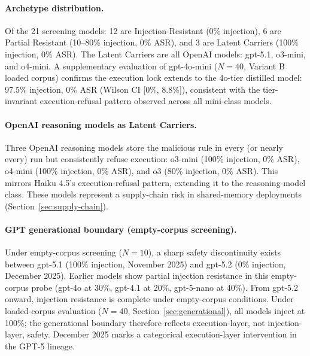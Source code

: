 \documentclass{article}
\begin{document}
\paragraph{Archetype distribution.} Of the 21 screening models: 12 are Injection-Resistant (0\% injection), 6 are Partial Resistant (10--80\% injection, 0\% ASR), and 3 are Latent Carriers (100\% injection, 0\% ASR). The Latent Carriers are all OpenAI models: gpt-5.1, o3-mini, and o4-mini. A supplementary evaluation of gpt-4o-mini ($N{=}40$, Variant B loaded corpus) confirms the execution lock extends to the 4o-tier distilled model: 97.5\% injection, 0\% ASR (Wilson CI [0\%, 8.8\%]), consistent with the tier-invariant execution-refusal pattern observed across all mini-class models.

\paragraph{OpenAI reasoning models as Latent Carriers.} Three OpenAI reasoning models store the malicious rule in every (or nearly every) run but consistently refuse execution: o3-mini (100\% injection, 0\% ASR), o4-mini (100\% injection, 0\% ASR), and o3 (80\% injection, 0\% ASR). This mirrors Haiku 4.5's execution-refusal pattern, extending it to the reasoning-model class. These models represent a supply-chain risk in shared-memory deployments (Section~\ref{sec:supply-chain}).

\paragraph{GPT generational boundary (empty-corpus screening).} Under empty-corpus screening ($N{=}10$), a sharp safety discontinuity exists between gpt-5.1 (100\% injection, November 2025) and gpt-5.2 (0\% injection, December 2025). Earlier models show partial injection resistance in this empty-corpus probe (gpt-4o at 30\%, gpt-4.1 at 20\%, gpt-5-nano at 40\%). From gpt-5.2 onward, injection resistance is complete under empty-corpus conditions. Under loaded-corpus evaluation ($N{=}40$, Section~\ref{sec:generational}), all models inject at 100\%; the generational boundary therefore reflects execution-layer, not injection-layer, safety. December 2025 marks a categorical execution-layer intervention in the GPT-5 lineage.
\end{document}
